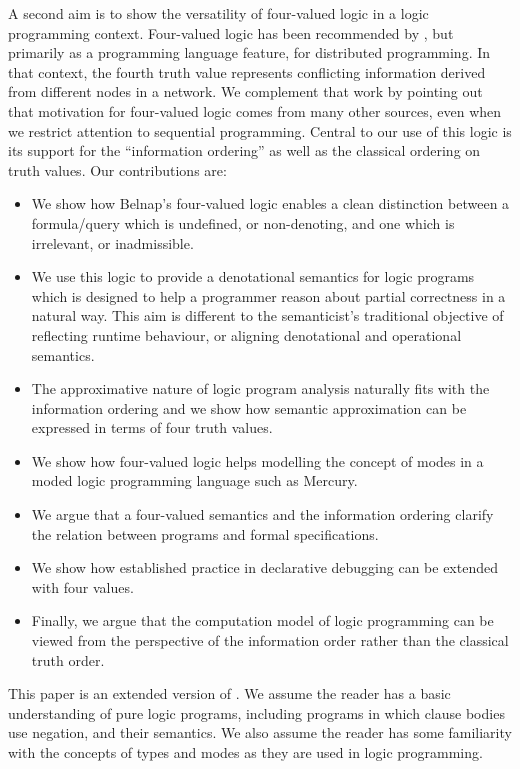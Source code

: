 \documentclass{tlp}
\begin{document}
A second aim is to show the versatility of four-valued logic
in a logic programming context.
Four-valued logic has been recommended by
,
but primarily as a programming language feature, for
distributed programming.
In that context,
the fourth truth value represents conflicting information
derived from different nodes in a network.
We complement that work by pointing out that motivation for
four-valued logic comes from many other sources, 
even when we restrict attention to sequential programming.
Central to our use of this logic is its support for the ``information
ordering'' as well as the classical ordering on truth values.
Our contributions are:
\begin{itemize}
\item 
We show how Belnap's four-valued logic enables a clean
distinction between a formula/query which is undefined,
or non-denoting, and one which is irrelevant, or inadmissible.
\item 
We use this logic to provide a denotational semantics for 
logic programs which is designed to help a programmer reason 
about partial correctness in a natural way.
This aim is different to the semanticist's traditional objective of 
reflecting runtime behaviour, or aligning denotational
and operational semantics.
\item 
The approximative nature of logic program analysis
naturally fits with the information ordering and we show how
semantic approximation can be expressed in terms of
four truth values.
\item 
We show how four-valued logic helps modelling the concept of 
modes in a moded logic programming language such as Mercury.
\item 
We argue that a four-valued semantics and the information ordering
clarify the relation between programs and formal specifications.
\item
We show how established practice in declarative debugging can be
extended with four values.
\item
Finally, we argue that the computation model of logic programming can
be viewed from the perspective of the information order rather than the
classical truth order.
\end{itemize}
This paper is an extended version of .
We assume the reader has a basic understanding of pure logic
programs, including programs in which clause bodies use negation,
and their semantics.
We also assume the reader has some familiarity with the concepts of
types and modes as they are used in logic programming.
\end{document}
